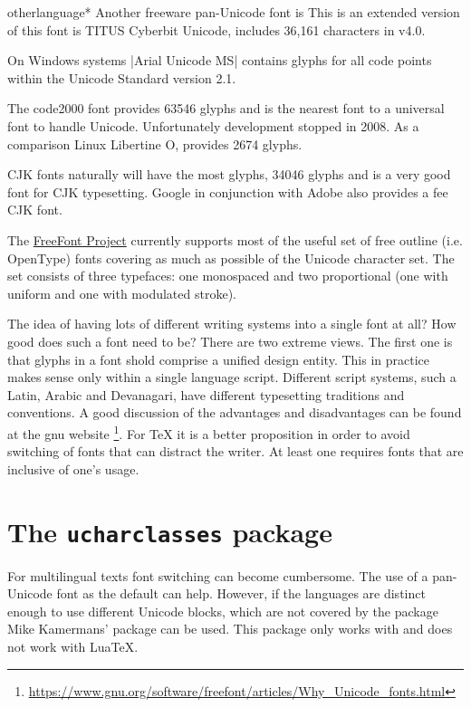 \begin{docCommandd}{otherlanguage*} { }
Another freeware pan-Unicode font is 
This is an extended version of this font is TITUS Cyberbit Unicode, includes 36,161 characters in v4.0.

On Windows systems |Arial Unicode MS| contains glyphs for all code points within the Unicode Standard version 2.1.  

The code2000 font provides 63546 glyphs and is the nearest font to a universal font to handle Unicode. Unfortunately development stopped in 2008. As a comparison Linux Libertine O, provides 2674 glyphs. \label{code2000}

CJK fonts naturally will have the most glyphs,  34046 glyphs and is a very good font for CJK typesetting. Google in conjunction with Adobe also provides a fee CJK font.

The \href{http://ftp.gnu.org/gnu/freefont/}{FreeFont Project} currently supports most of the useful set of free outline (i.e. OpenType) fonts covering as much as possible of the Unicode character set. The set consists of three typefaces: one monospaced and two proportional (one with uniform and one with modulated stroke). 

The idea of having lots of different writing systems into a single font at all? How good does such a font need to be?
There are two extreme views.  The first one is that glyphs in a font shold comprise a unified design entity. This in practice makes sense only within a single language script. Different script systems, such a Latin, Arabic and Devanagari, have different typesetting traditions and conventions.  A good discussion of the advantages and disadvantages can be found at the gnu website \footnote{\protect\url{https://www.gnu.org/software/freefont/articles/Why_Unicode_fonts.html}}. For TeX it is a better proposition in order to avoid switching of fonts that can distract the writer. At least one requires fonts that are inclusive of one's usage. 

\section{The \texttt{ucharclasses} package}

For multilingual texts font switching can become cumbersome. The use of a pan-Unicode font as the default can help. However, if the languages are distinct enough to use different Unicode blocks, which are not covered by the  package Mike Kamermans' package  can be used. This package only works with \xelatex and does not work with LuaTeX. 


\end{docCommandd}
